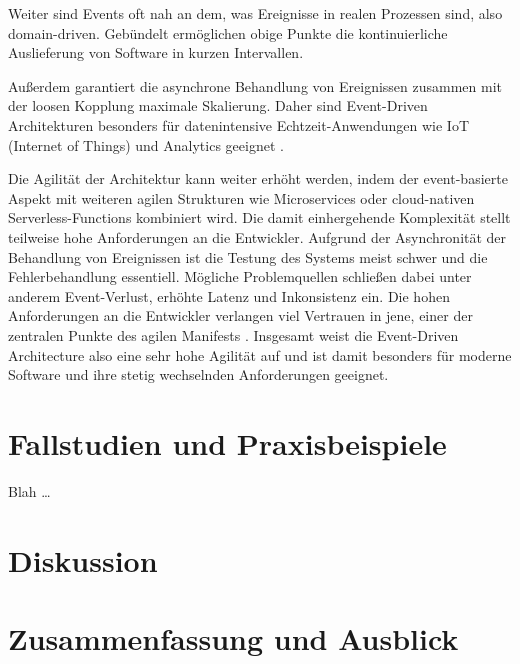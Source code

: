 \documentclass[acmtog]{acmart}
\begin{document}
Weiter sind Events oft nah an dem, was Ereignisse in realen Prozessen sind, also domain-driven.
Gebündelt ermöglichen obige Punkte die kontinuierliche Auslieferung von Software in kurzen Intervallen.

Außerdem garantiert die asynchrone Behandlung von Ereignissen zusammen mit der loosen Kopplung maximale Skalierung.
Daher sind Event-Driven Architekturen besonders für datenintensive Echtzeit-Anwendungen wie IoT (Internet of Things) und Analytics geeignet \cite{iotEda}.

Die Agilität der Architektur kann weiter erhöht werden, indem der event-basierte Aspekt mit weiteren agilen Strukturen wie Microservices oder cloud-nativen Serverless-Functions kombiniert wird.
Die damit einhergehende Komplexität stellt teilweise hohe Anforderungen an die Entwickler.
Aufgrund der Asynchronität der Behandlung von Ereignissen ist die Testung des Systems meist schwer und die Fehlerbehandlung essentiell.
Mögliche Problemquellen schließen dabei unter anderem Event-Verlust, erhöhte Latenz und Inkonsistenz ein.
Die hohen Anforderungen an die Entwickler verlangen viel Vertrauen in jene, einer der zentralen Punkte des agilen Manifests \cite{agileManifesto}.
Insgesamt weist die Event-Driven Architecture also eine sehr hohe Agilität auf und ist damit besonders für moderne Software und ihre stetig wechselnden Anforderungen geeignet.


\section{Fallstudien und Praxisbeispiele}
Blah \ldots

\section{Diskussion}

\section{Zusammenfassung und Ausblick}








\appendix
\end{document}
